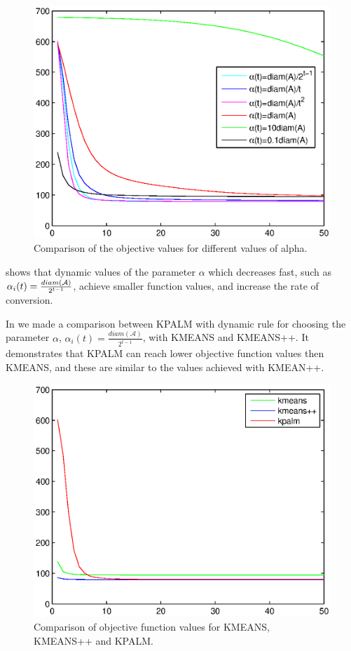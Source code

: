 \documentclass[11pt]{article}
\numberwithin{equation}{section}
\begin{document}
\begin{figure}[h]
    \centering
    \includegraphics{dynamic_alpha_kpalm}
    \caption{Comparison of the objective values for different values of alpha.}
    \label{fig:dynamic_alpha_psi_comp}
\end{figure} 

 shows that dynamic values of the parameter $\alpha$ which decreases fast, such as $\alpha_i(t)=\\\frac{diam(\mathcal{A})}{2^{t-1}}$, achieve smaller function values, and increase the rate of conversion.

\newpage
In  we made a comparison between KPALM with dynamic rule for choosing the parameter $\alpha$, $\alpha_i(t)=\frac{diam(\mathcal{A})}{2^{t-1}}$, with KMEANS and KMEANS++. It demonstrates that KPALM can reach lower objective function values then KMEANS, and these are similar to the values achieved with KMEAN++.

\begin{figure}[t]
    \centering
    \includegraphics{psi_algs_comparison}
    \caption{Comparison of objective function values for KMEANS, KMEANS++ and KPALM.}
     \label{fig:algs_psi_comp}
\end{figure}
\end{document}
